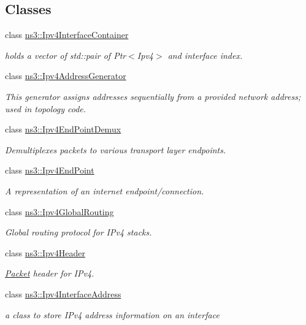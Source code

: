\subsection*{Classes}
\begin{DoxyCompactItemize}
\item 
class \hyperlink{classns3_1_1Ipv4InterfaceContainer}{ns3\+::\+Ipv4\+Interface\+Container}
\begin{DoxyCompactList}\small\item\em holds a vector of std\+::pair of Ptr$<$\+Ipv4$>$ and interface index. \end{DoxyCompactList}\item 
class \hyperlink{classns3_1_1Ipv4AddressGenerator}{ns3\+::\+Ipv4\+Address\+Generator}
\begin{DoxyCompactList}\small\item\em This generator assigns addresses sequentially from a provided network address; used in topology code. \end{DoxyCompactList}\item 
class \hyperlink{classns3_1_1Ipv4EndPointDemux}{ns3\+::\+Ipv4\+End\+Point\+Demux}
\begin{DoxyCompactList}\small\item\em Demultiplexes packets to various transport layer endpoints. \end{DoxyCompactList}\item 
class \hyperlink{classns3_1_1Ipv4EndPoint}{ns3\+::\+Ipv4\+End\+Point}
\begin{DoxyCompactList}\small\item\em A representation of an internet endpoint/connection. \end{DoxyCompactList}\item 
class \hyperlink{classns3_1_1Ipv4GlobalRouting}{ns3\+::\+Ipv4\+Global\+Routing}
\begin{DoxyCompactList}\small\item\em Global routing protocol for I\+Pv4 stacks. \end{DoxyCompactList}\item 
class \hyperlink{classns3_1_1Ipv4Header}{ns3\+::\+Ipv4\+Header}
\begin{DoxyCompactList}\small\item\em \hyperlink{classns3_1_1Packet}{Packet} header for I\+Pv4. \end{DoxyCompactList}\item 
class \hyperlink{classns3_1_1Ipv4InterfaceAddress}{ns3\+::\+Ipv4\+Interface\+Address}
\begin{DoxyCompactList}\small\item\em a class to store I\+Pv4 address information on an interface \end{DoxyCompactList}\item 

\end{DoxyCompactItemize}
